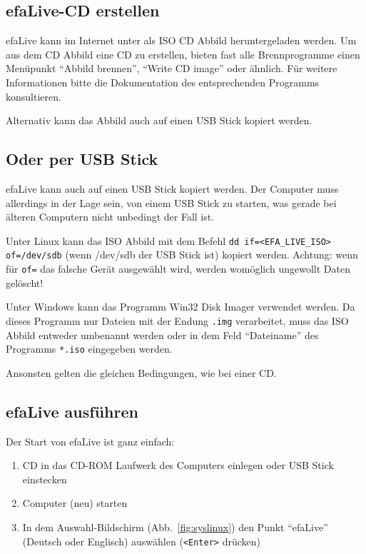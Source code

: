 \documentclass[a4paper,12pt,twoside]{article}
\begin{document}
\subsection{efaLive-CD erstellen}
\label{sct:cd_erstellen}
efaLive kann im Internet unter \cite{EFA4} als ISO CD Abbild
heruntergeladen werden. Um aus dem CD Abbild eine CD zu erstellen,
bieten fast alle Brennprogramme einen Menüpunkt "`Abbild brennen"', 
"`Write CD image"' oder ähnlich. Für weitere Informationen bitte 
die Dokumentation des entsprechenden Programms konsultieren. 

Alternativ kann das Abbild auch auf einen USB Stick kopiert werden.

\subsection{Oder per USB Stick}
\label{sct:usb_stick}
efaLive kann auch auf einen USB Stick kopiert werden.
Der Computer muss allerdings in der Lage sein, von einem USB Stick zu
starten, was gerade bei älteren Computern nicht unbedingt der Fall ist.

Unter Linux kann das ISO Abbild mit dem Befehl \texttt{dd if={\textless}EFA\_LIVE\_ISO{\textgreater} 
of=/dev/sdb} (wenn /dev/sdb der USB Stick ist) kopiert werden. Achtung: 
wenn für \texttt{of=} das falsche Gerät ausgewählt wird, werden womöglich 
ungewollt Daten gelöscht!

Unter Windows kann das Programm Win32 Disk Imager \cite{IMG1} verwendet
werden. Da dieses Programm nur Dateien mit der Endung \texttt{.img} 
verarbeitet, muss das ISO Abbild entweder umbenannt werden oder in dem 
Feld "`Dateiname"' des Programms \texttt{*.iso} eingegeben werden.

Ansonsten gelten die gleichen Bedingungen, wie bei einer CD.


\subsection{efaLive ausführen}
\label{sct:live_ausfuehren}
Der Start von efaLive ist ganz einfach:

\begin{enumerate}
    \item CD in das CD-ROM Laufwerk des Computers einlegen oder USB Stick
        einstecken
    \item Computer (neu) starten
    \item In dem Auswahl-Bildschirm (Abb.~\ref{fig:syslinux}) den Punkt
        "`efaLive"' (Deutsch oder Englisch) auswählen (\texttt{{\textless}Enter{\textgreater}} 
        drücken)
\end{enumerate}
\end{document}
